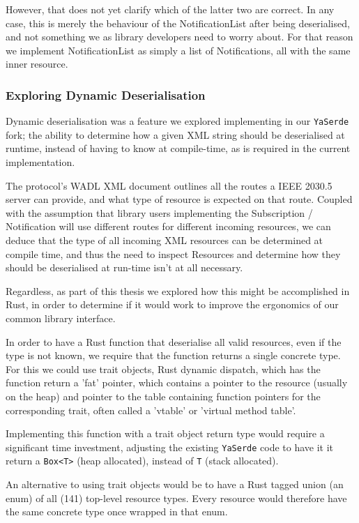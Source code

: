 However, that does not yet clarify which of the latter two are correct. In any case, this is merely the behaviour of the NotificationList after being deserialised, and not something we as library developers need to worry about. For that reason we implement NotificationList as simply a list of Notifications, all with the same inner resource.

\subsubsection{Exploring Dynamic Deserialisation}
Dynamic deserialisation was a feature we explored implementing in our \texttt{YaSerde} fork; the ability to determine how a given XML string should be deserialised at runtime, instead of having to know at compile-time, as is required in the current implementation.

The protocol's WADL XML document outlines all the routes a IEEE 2030.5 server can provide, and what type of resource is expected on that route. Coupled with the assumption that library users implementing the Subscription / Notification will use different routes for different incoming resources, we can deduce that the type of all incoming XML resources can be determined at compile time, and thus the need to inspect Resources and determine how they should be deserialised at run-time isn't at all necessary. 

Regardless, as part of this thesis we explored how this might be accomplished in Rust, in order to determine if it would work to improve the ergonomics of our common library interface.

In order to have a Rust function that deserialise all valid resources, even if the type is not known, we require that the function returns a single concrete type. For this we could use trait objects, Rust dynamic dispatch, which has the function return a 'fat' pointer, which contains a pointer to the resource (usually on the heap) and pointer to the table containing function pointers for the corresponding trait, often called a 'vtable' or 'virtual method table'. 

Implementing this function with a trait object return type would require a significant time investment, adjusting the existing \texttt{YaSerde} code to have it it return a \texttt{Box<T>} (heap allocated), instead of \texttt{T} (stack allocated).

An alternative to using trait objects would be to have a Rust tagged union (an enum) of all (141) top-level resource types. Every resource would therefore have the same concrete type once wrapped in that enum.

